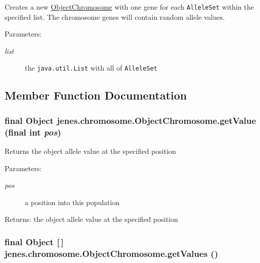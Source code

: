 Creates a new \hyperlink{classjenes_1_1chromosome_1_1_object_chromosome}{ObjectChromosome} with one gene for each {\tt AlleleSet} within the specified list. The chromosome genes will contain random allele values. 

\begin{Desc}
\item[Parameters:]
\begin{description}
\item[{\em list}]the {\tt java.util.List} with all of {\tt AlleleSet} \end{description}
\end{Desc}


\subsection{Member Function Documentation}
\hypertarget{classjenes_1_1chromosome_1_1_object_chromosome_f221c16bbcd9f03867d2e4295216cc93}{
\subsubsection[getValue]{\setlength{\rightskip}{0pt plus 5cm}final Object jenes.chromosome.ObjectChromosome.getValue (final int {\em pos})}}
\label{classjenes_1_1chromosome_1_1_object_chromosome_f221c16bbcd9f03867d2e4295216cc93}


Returns the object allele value at the specified position 

\begin{Desc}
\item[Parameters:]
\begin{description}
\item[{\em pos}]a position into this population \end{description}
\end{Desc}
\begin{Desc}
\item[Returns:]the object allele value at the specified position \end{Desc}
\hypertarget{classjenes_1_1chromosome_1_1_object_chromosome_f41d722cff36fbb837c0038c885de04c}{
\subsubsection[getValues]{\setlength{\rightskip}{0pt plus 5cm}final Object \mbox{[}$\,$\mbox{]} jenes.chromosome.ObjectChromosome.getValues ()}}
\label{classjenes_1_1chromosome_1_1_object_chromosome_f41d722cff36fbb837c0038c885de04c}


